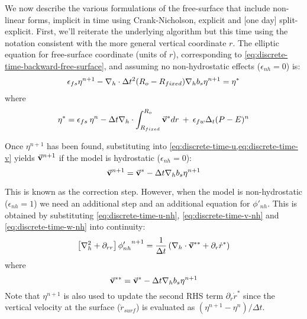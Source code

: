 We now describe the various formulations of the free-surface that
include non-linear forms, implicit in time using Crank-Nicholson,
explicit and [one day] split-explicit. First, we'll reiterate the
underlying algorithm but this time using the notation consistent with
the more general vertical coordinate $r$. The elliptic equation for
free-surface coordinate (units of $r$), corresponding to
\ref{eq:discrete-time-backward-free-surface}, and
assuming no non-hydrostatic effects ($\epsilon_{nh} = 0$) is:
\begin{eqnarray}
\epsilon_{fs} {\eta}^{n+1} -
{\bf \nabla}_h \cdot \Delta t^2 (R_o-R_{fixed}) {\bf \nabla}_h b_s
{\eta}^{n+1} = {\eta}^*
\label{eq-solve2D}
\end{eqnarray}
where
\begin{eqnarray}
{\eta}^* = \epsilon_{fs} \: {\eta}^{n} -
\Delta t {\bf \nabla}_h \cdot \int_{R_{fixed}}^{R_o} \vec{\bf v}^* dr
\: + \: \epsilon_{fw} \Delta_t (P-E)^{n} 
\label{eq-solve2D_rhs}
\end{eqnarray}



Once ${\eta}^{n+1}$ has been found, substituting into
\ref{eq:discrete-time-u,eq:discrete-time-v} yields $\vec{\bf v}^{n+1}$ if the model is
hydrostatic ($\epsilon_{nh}=0$):
$$
\vec{\bf v}^{n+1} = \vec{\bf v}^{*}
- \Delta t {\bf \nabla}_h b_s {\eta}^{n+1}
$$

This is known as the correction step. However, when the model is
non-hydrostatic ($\epsilon_{nh}=1$) we need an additional step and an
additional equation for $\phi'_{nh}$. This is obtained by substituting
\ref{eq:discrete-time-u-nh}, \ref{eq:discrete-time-v-nh} and \ref{eq:discrete-time-w-nh}
into continuity:
\begin{equation}
\left[ {\bf \nabla}_h^2 + \partial_{rr} \right] {\phi'_{nh}}^{n+1}
= \frac{1}{\Delta t} \left(
{\bf \nabla}_h \cdot \vec{\bf v}^{**} + \partial_r \dot{r}^* \right)
\end{equation}
where
\begin{displaymath}
\vec{\bf v}^{**} = \vec{\bf v}^* - \Delta t {\bf \nabla}_h b_s {\eta}^{n+1}
\end{displaymath}
Note that $\eta^{n+1}$ is also used to update the second RHS term
$\partial_r \dot{r}^* $ since
the vertical velocity at the surface ($\dot{r}_{surf}$) 
is evaluated as $(\eta^{n+1} - \eta^n) / \Delta t$.

